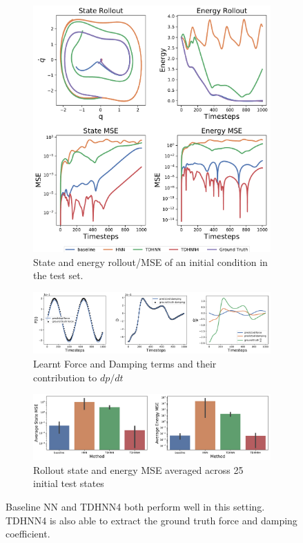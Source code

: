 \documentclass[twoside]{article}
\begin{document}
\begin{figure}[h!]
\centering
\captionsetup{justification=centering}
	\begin{subfigure}[b]{0.4\textwidth}
		\centering
		\includegraphics[width=\textwidth]{figures/duffing_state.pdf}
		\caption{State and energy rollout/MSE of an initial condition in the test set.}
	\end{subfigure}
	\begin{subfigure}[b]{0.48\textwidth}
		\centering
		\includegraphics[width=\textwidth]{figures/dpdt_duffing.pdf}
		\caption{Learnt Force and Damping terms and their contribution to $dp/dt$}
	\end{subfigure}
	\begin{subfigure}[b]{0.48\textwidth}
	    \centering
		\includegraphics[width=\textwidth]{figures/duffing_errors.pdf}
		\caption{Rollout state and energy MSE averaged across 25 initial test states}
	\end{subfigure}
\caption{Baseline NN and TDHNN4 both perform well in this setting. TDHNN4 is also able to extract the ground truth force and damping coefficient.}
\label{fig.duffing}
\end{figure}
\end{document}
